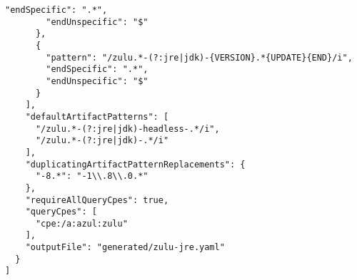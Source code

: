 \begin{lstlisting}[style=json,caption={Korrelationsgeneratordatei im Generatorformat für JRE/JDK},label={lst:correlation-generator-format-cpe-jre-jdk},basicstyle=\ttfamily\scriptsize]
        "endSpecific": ".*",
        "endUnspecific": "$"
      },
      {
        "pattern": "/zulu.*-(?:jre|jdk)-{VERSION}.*{UPDATE}{END}/i",
        "endSpecific": ".*",
        "endUnspecific": "$"
      }
    ],
    "defaultArtifactPatterns": [
      "/zulu.*-(?:jre|jdk)-headless-.*/i",
      "/zulu.*-(?:jre|jdk)-.*/i"
    ],
    "duplicatingArtifactPatternReplacements": {
      "-8.*": "-1\\.8\\.0.*"
    },
    "requireAllQueryCpes": true,
    "queryCpes": [
      "cpe:/a:azul:zulu"
    ],
    "outputFile": "generated/zulu-jre.yaml"
  }
]
\end{lstlisting}

